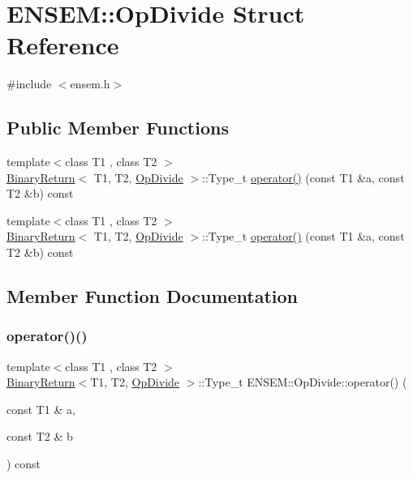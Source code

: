 \hypertarget{structENSEM_1_1OpDivide}{}\section{E\+N\+S\+EM\+:\+:Op\+Divide Struct Reference}
\label{structENSEM_1_1OpDivide}


{\ttfamily \#include $<$ensem.\+h$>$}

\subsection*{Public Member Functions}
\begin{DoxyCompactItemize}
\item 
{\footnotesize template$<$class T1 , class T2 $>$ }\\\mbox{\hyperlink{structENSEM_1_1BinaryReturn}{Binary\+Return}}$<$ T1, T2, \mbox{\hyperlink{structENSEM_1_1OpDivide}{Op\+Divide}} $>$\+::Type\+\_\+t \mbox{\hyperlink{structENSEM_1_1OpDivide_a20d785467177a704a754587d984736c3}{operator()}} (const T1 \&a, const T2 \&b) const
\item 
{\footnotesize template$<$class T1 , class T2 $>$ }\\\mbox{\hyperlink{structENSEM_1_1BinaryReturn}{Binary\+Return}}$<$ T1, T2, \mbox{\hyperlink{structENSEM_1_1OpDivide}{Op\+Divide}} $>$\+::Type\+\_\+t \mbox{\hyperlink{structENSEM_1_1OpDivide_a20d785467177a704a754587d984736c3}{operator()}} (const T1 \&a, const T2 \&b) const
\end{DoxyCompactItemize}


\subsection{Member Function Documentation}
\mbox{\label{structENSEM_1_1OpDivide_a20d785467177a704a754587d984736c3}} 
\subsubsection{\texorpdfstring{operator()()}{operator()()}\hspace{0.1cm}{\footnotesize\ttfamily [1/2]}}
{\footnotesize\ttfamily template$<$class T1 , class T2 $>$ \\
\mbox{\hyperlink{structENSEM_1_1BinaryReturn}{Binary\+Return}}$<$T1, T2, \mbox{\hyperlink{structENSEM_1_1OpDivide}{Op\+Divide}} $>$\+::Type\+\_\+t E\+N\+S\+E\+M\+::\+Op\+Divide\+::operator() (\begin{DoxyParamCaption}\item[{const T1 \&}]{a,  }\item[{const T2 \&}]{b }\end{DoxyParamCaption}) const\hspace{0.3cm}{\ttfamily [inline]}}

